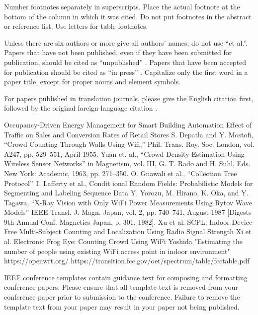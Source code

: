 \documentclass[conference]{IEEEtran}
\begin{document}
Number footnotes separately in superscripts. Place the actual footnote at 
the bottom of the column in which it was cited. Do not put footnotes in the 
abstract or reference list. Use letters for table footnotes.

Unless there are six authors or more give all authors' names; do not use 
``et al.''. Papers that have not been published, even if they have been 
submitted for publication, should be cited as ``unpublished'' \cite{b4}. Papers 
that have been accepted for publication should be cited as ``in press'' \cite{b5}. 
Capitalize only the first word in a paper title, except for proper nouns and 
element symbols.

For papers published in translation journals, please give the English 
citation first, followed by the original foreign-language citation \cite{b6}.
\begin{thebibliography}{00}
 Occupancy-Driven Energy Management for Smart Building Automation
 Effect of Traffic on Sales and Conversion Rates of Retail Stores
 S. Depatla and Y. Mostofi, ``Crowd Counting Through Walls Using Wifi,'' Phil. Trans. Roy. Soc. London, vol. A247, pp. 529--551, April 1955.
 Yuan et. al., ``Crowd Density Estimation Using Wireless Sensor Networks'' in Magnetism, vol. III, G. T. Rado and H. Suhl, Eds. New York: Academic, 1963, pp. 271--350.
 O. Gnawali et al., ``Collection Tree Protocol''
 J. Lafferty et al., Condit
ional Random Fields: Probabilistic Models for Segmenting and Labeling Sequence Data
 Y. Yorozu, M. Hirano, K. Oka, and Y. Tagawa, ``X-Ray Vision with Only WiFi Power Measurements Using Rytov Wave Models'' IEEE Transl. J. Magn. Japan, vol. 2, pp. 740--741, August 1987 [Digests 9th Annual Conf. Magnetics Japan, p. 301, 1982].
 Xu et al. SCPL: Indoor Device-Free Multi-Subject Counting and Localization Using Radio Signal Strength
 Xi et al. Electronic Frog Eye: Counting Crowd Using WiFi
 Yoshida "Estimating the number of people using existing WiFi access point
in indoor environment"
 https://openwrt.org/
 https://transition.fcc.gov/oet/spectrum/table/fcctable.pdf

\end{thebibliography}
\vspace{12pt}
\color{red}
IEEE conference templates contain guidance text for composing and formatting conference papers. Please ensure that all template text is removed from your conference paper prior to submission to the conference. Failure to remove the template text from your paper may result in your paper not being published.
\end{document}
